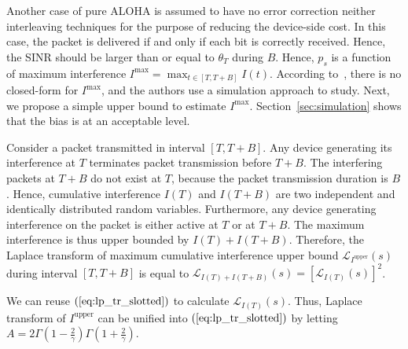 Another case of pure ALOHA is assumed to have no error correction neither interleaving techniques for the purpose of reducing the device-side cost. In this case, the packet is delivered if and only if each bit is correctly received. Hence, the SINR should be larger than or equal to $\theta_{T}$ during $B$. Hence, $p_{s}$ is a function of maximum interference $I^{\text{max}} = \max_{t \in \left[ T, T+B\right]} I(t)$. According to~\cite[Sec.2.4]{blaszczyszyn2015interference}, there is no closed-form for $I^{\text{max}} $, and the authors use a simulation approach to study. Next, we propose a simple upper bound to estimate $I^{\text{max}}$. Section~\ref{sec:simulation} shows that the bias is at an acceptable level.

Consider a packet transmitted in interval $\left[ T, T+B\right]$. Any device generating its interference at $T$ terminates packet transmission before $T+B$. The interfering packets at $T+B$ do not exist at $T$, because the packet transmission duration is $B$. 
Hence, cumulative interference $I(T)$ and $I(T+B)$ are two independent and identically distributed random variables. Furthermore, any device generating interference on the packet is either active at $T$  or at $T+B$. The maximum interference is thus upper bounded by $I(T)+I(T+B)$. Therefore, the Laplace transform of maximum cumulative interference upper bound $\mathcal{L}_{I^{\text{upper}}}\left( s \right)$ during interval $\left[ T, T+B\right]$ is equal to $ \mathcal{L}_{I(T)+I(T+B)}\left( s\right)= \left[ \mathcal{L}_{I(T)}\left( s\right) \right]^2$. 

We can reuse $(\ref{eq:lp_tr_slotted})$ to calculate $\mathcal{L}_{I(T)}\left( s\right)$. Thus, Laplace transform of $I^{\text{upper}}$ can be unified into $(\ref{eq:lp_tr_slotted})$ by letting $A=2 \Gamma(1-\frac{2}{\gamma}) \Gamma(1+\frac{2}{\gamma})$. 


